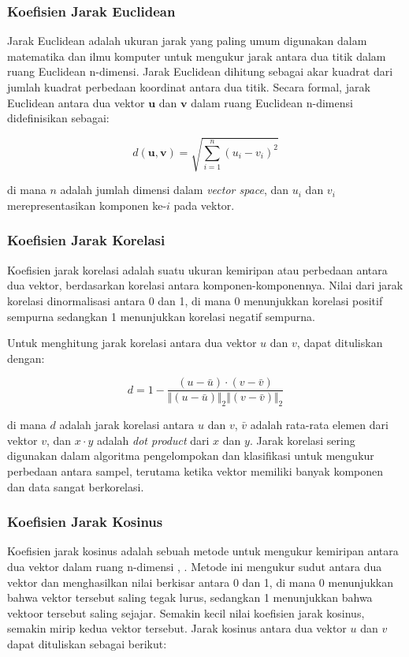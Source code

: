 \subsubsection{Koefisien Jarak Euclidean}
Jarak Euclidean adalah ukuran jarak yang paling umum digunakan dalam matematika dan ilmu komputer untuk mengukur jarak antara dua titik dalam ruang Euclidean
n-dimensi. Jarak Euclidean dihitung sebagai akar kuadrat dari jumlah kuadrat perbedaan koordinat antara dua titik. Secara formal, jarak Euclidean antara dua
vektor $\mathbf{u}$ dan $\mathbf{v}$ dalam ruang Euclidean n-dimensi didefinisikan sebagai:

\begin{equation}
	d(\mathbf{u},\mathbf{v}) = \sqrt{\sum_{i=1}^{n}(u_i - v_i)^2}
\end{equation}

\noindent di mana $n$ adalah jumlah dimensi dalam \emph{vector space}, dan $u_i$ dan $v_i$ merepresentasikan komponen ke-$i$ pada vektor.

\subsubsection{Koefisien Jarak Korelasi}
Koefisien jarak korelasi adalah suatu ukuran kemiripan atau perbedaan antara dua vektor, berdasarkan korelasi antara komponen-komponennya. Nilai dari jarak
korelasi dinormalisasi antara 0 dan 1, di mana 0 menunjukkan korelasi positif sempurna sedangkan 1 menunjukkan korelasi negatif sempurna.

Untuk menghitung jarak korelasi antara dua vektor $u$ dan $v$, dapat dituliskan dengan:

\begin{equation}
	d = 1-\frac{(u-\bar{u})\cdot (v-\bar{v})}{\Vert(u-\bar{u})\Vert_2\Vert(v-\bar{v})\Vert_2}
\end{equation}

\noindent di mana $d$ adalah jarak korelasi antara $u$ dan $v$, $\bar{v}$ adalah rata-rata elemen dari vektor $v$, dan $x\cdot y$ adalah \emph{dot product} dari $x$ dan $y$. Jarak korelasi sering digunakan dalam algoritma pengelompokan dan klasifikasi untuk mengukur perbedaan antara sampel, terutama ketika vektor memiliki banyak komponen dan data sangat berkorelasi.

\subsubsection{Koefisien Jarak Kosinus}
Koefisien jarak kosinus adalah sebuah metode untuk mengukur kemiripan antara dua vektor dalam ruang n-dimensi \cite{schutze2008introduction},
\cite{deisenroth2020mathematics}. Metode ini mengukur sudut antara dua vektor dan menghasilkan nilai berkisar antara 0 dan 1, di mana 0 menunjukkan bahwa
vektor tersebut saling tegak lurus, sedangkan 1 menunjukkan bahwa vektoor tersebut saling sejajar. Semakin kecil nilai koefisien jarak kosinus, semakin mirip
kedua vektor tersebut. Jarak kosinus antara dua vektor $u$ dan $v$ dapat dituliskan sebagai berikut:

